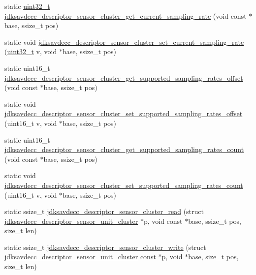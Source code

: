 \begin{DoxyCompactItemize}
\item 
static \hyperlink{parse_8c_a6eb1e68cc391dd753bc8ce896dbb8315}{uint32\+\_\+t} \hyperlink{group__descriptor__sensor__cluster_gadd33e2ed17d74f29063cfaf47c6eda7a}{jdksavdecc\+\_\+descriptor\+\_\+sensor\+\_\+cluster\+\_\+get\+\_\+current\+\_\+sampling\+\_\+rate} (void const $\ast$base, ssize\+\_\+t pos)
\item 
static void \hyperlink{group__descriptor__sensor__cluster_gad341ee570253759b0d5cddb7306dc643}{jdksavdecc\+\_\+descriptor\+\_\+sensor\+\_\+cluster\+\_\+set\+\_\+current\+\_\+sampling\+\_\+rate} (\hyperlink{parse_8c_a6eb1e68cc391dd753bc8ce896dbb8315}{uint32\+\_\+t} v, void $\ast$base, ssize\+\_\+t pos)
\item 
static uint16\+\_\+t \hyperlink{group__descriptor__sensor__cluster_ga6569e845777ad42634c9f0b89cdf5483}{jdksavdecc\+\_\+descriptor\+\_\+sensor\+\_\+cluster\+\_\+get\+\_\+supported\+\_\+sampling\+\_\+rates\+\_\+offset} (void const $\ast$base, ssize\+\_\+t pos)
\item 
static void \hyperlink{group__descriptor__sensor__cluster_ga5b807a2f186c734c01212e809109bd04}{jdksavdecc\+\_\+descriptor\+\_\+sensor\+\_\+cluster\+\_\+set\+\_\+supported\+\_\+sampling\+\_\+rates\+\_\+offset} (uint16\+\_\+t v, void $\ast$base, ssize\+\_\+t pos)
\item 
static uint16\+\_\+t \hyperlink{group__descriptor__sensor__cluster_ga6ca97d3665de32d7c1714d5f08165f46}{jdksavdecc\+\_\+descriptor\+\_\+sensor\+\_\+cluster\+\_\+get\+\_\+supported\+\_\+sampling\+\_\+rates\+\_\+count} (void const $\ast$base, ssize\+\_\+t pos)
\item 
static void \hyperlink{group__descriptor__sensor__cluster_ga71e9a99bb7f289e59f91cfdaa507ebd4}{jdksavdecc\+\_\+descriptor\+\_\+sensor\+\_\+cluster\+\_\+set\+\_\+supported\+\_\+sampling\+\_\+rates\+\_\+count} (uint16\+\_\+t v, void $\ast$base, ssize\+\_\+t pos)
\item 
static ssize\+\_\+t \hyperlink{group__descriptor__sensor__cluster_ga1f8833a06a4f018139f9d5ce3ccc1a65}{jdksavdecc\+\_\+descriptor\+\_\+sensor\+\_\+cluster\+\_\+read} (struct \hyperlink{structjdksavdecc__descriptor__sensor__unit__cluster}{jdksavdecc\+\_\+descriptor\+\_\+sensor\+\_\+unit\+\_\+cluster} $\ast$p, void const $\ast$base, ssize\+\_\+t pos, size\+\_\+t len)
\item 
static ssize\+\_\+t \hyperlink{group__descriptor__sensor__cluster_ga60e5159f644801f50824613757156857}{jdksavdecc\+\_\+descriptor\+\_\+sensor\+\_\+cluster\+\_\+write} (struct \hyperlink{structjdksavdecc__descriptor__sensor__unit__cluster}{jdksavdecc\+\_\+descriptor\+\_\+sensor\+\_\+unit\+\_\+cluster} const $\ast$p, void $\ast$base, size\+\_\+t pos, size\+\_\+t len)
\end{DoxyCompactItemize}


